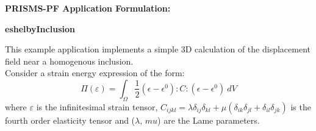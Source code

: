 \documentclass[10pt]{article}
\begin{document}
\def\Bomega{\mbox{\boldmath$\omega$}}
\def\Bvarepsilon{\mbox{\boldmath$\varepsilon$}}
\def\Bvartheta{\mbox{\boldmath$\vartheta$}}
\def\Bvarpi{\mbox{\boldmath$\varpi$}}
\def\Bvarrho{\mbox{\boldmath$\varrho$}}
\def\Bvarsigma{\mbox{\boldmath$\varsigma$}}
\def\Bvarphi{\mbox{\boldmath$\varphi$}}
\def\bone{\mathbf{1}}
\def\bzero{\mathbf{0}}
\def\bA{\mbox{\boldmath$ A$}}
\def\bB{\mbox{\boldmath$ B$}}
\def\bC{\mbox{\boldmath$ C$}}
\def\bD{\mbox{\boldmath$ D$}}
\def\bE{\mbox{\boldmath$ E$}}
\def\bF{\mbox{\boldmath$ F$}}
\def\bG{\mbox{\boldmath$ G$}}
\def\bH{\mbox{\boldmath$ H$}}
\def\bI{\mbox{\boldmath$ I$}}
\def\bJ{\mbox{\boldmath$ J$}}
\def\bK{\mbox{\boldmath$ K$}}
\def\bL{\mbox{\boldmath$ L$}}
\def\bM{\mbox{\boldmath$ M$}}
\def\bN{\mbox{\boldmath$ N$}}
\def\bO{\mbox{\boldmath$ O$}}
\def\bP{\mbox{\boldmath$ P$}}
\def\bQ{\mbox{\boldmath$ Q$}}
\def\bR{\mbox{\boldmath$ R$}}
\def\bS{\mbox{\boldmath$ S$}}
\def\bT{\mbox{\boldmath$ T$}}
\def\bU{\mbox{\boldmath$ U$}}
\def\bV{\mbox{\boldmath$ V$}}
\def\bW{\mbox{\boldmath$ W$}}
\def\bX{\mbox{\boldmath$ X$}}
\def\bY{\mbox{\boldmath$ Y$}}
\def\bZ{\mbox{\boldmath$ Z$}}
\def\ba{\mbox{\boldmath$ a$}}
\def\bb{\mbox{\boldmath$ b$}}
\def\bc{\mbox{\boldmath$ c$}}
\def\bd{\mbox{\boldmath$ d$}}
\def\be{\mbox{\boldmath$ e$}}
\def\bff{\mbox{\boldmath$ f$}}
\def\bg{\mbox{\boldmath$ g$}}
\def\bh{\mbox{\boldmath$ h$}}
\def\bi{\mbox{\boldmath$ i$}}
\def\bj{\mbox{\boldmath$ j$}}
\def\bk{\mbox{\boldmath$ k$}}
\def\bl{\mbox{\boldmath$ l$}}
\def\bm{\mbox{\boldmath$ m$}}
\def\bn{\mbox{\boldmath$ n$}}
\def\bo{\mbox{\boldmath$ o$}}
\def\bp{\mbox{\boldmath$ p$}}
\def\bq{\mbox{\boldmath$ q$}}
\def\br{\mbox{\boldmath$ r$}}
\def\bs{\mbox{\boldmath$ s$}}
\def\bt{\mbox{\boldmath$ t$}}
\def\bu{\mbox{\boldmath$ u$}}
\def\bv{\mbox{\boldmath$ v$}}
\def\bw{\mbox{\boldmath$ w$}}
\def\bx{\mbox{\boldmath$ x$}}
\def\by{\mbox{\boldmath$ y$}}
\def\bz{\mbox{\boldmath$ z$}}
\centerline{\Large{\bf PRISMS-PF Application Formulation:}}
\smallskip
\centerline{\Large{\bf eshelbyInclusion}}
\bigskip

This example application implements a simple 3D calculation of the displacement field near a homogenous inclusion. 
\\
Consider a strain energy expression of the form:
\begin{equation}
  \Pi(\varepsilon) = \int_{\Omega}  \frac{1}{2} (\epsilon-\epsilon^0):C: (\epsilon-\epsilon^0)   ~dV 
\end{equation}
where $\varepsilon$ is the infinitesimal strain tensor, $C_{ijkl}=\lambda \delta_{ij} \delta_{kl}+\mu ( \delta_{ik} \delta_{jl}+ \delta_{il} \delta_{jk} )$  is the fourth order elasticity tensor and ($\lambda$, $mu$) are the Lame parameters.
\end{document}
